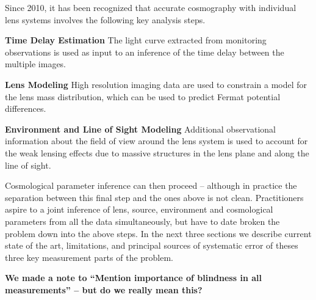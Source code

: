 Since 2010, it has been recognized that accurate cosmography with
individual lens systems involves the following key analysis steps.

\begin{description}
    \item{\bf Time Delay Estimation} The light curve extracted from
    monitoring observations is used as input to an inference of the
    time delay between the multiple images.
    \item{\bf Lens Modeling} High resolution imaging data are used to
    constrain a model for the lens mass distribution, which can be used
    to predict Fermat potential differences.
    \item{\bf Environment and Line of Sight Modeling} Additional observational
    information about the field of view around the lens system is used
    to account for the weak lensing effects due to massive structures in
    the lens plane and along the line of sight.
\end{description}

Cosmological parameter inference can then proceed -- although in
practice the  separation between this final step and the ones above is
not clean. Practitioners aspire to a joint inference of lens, source,
environment and cosmological parameters from all the data
simultaneously, but have to date broken the problem down  into the above
steps. In the next three sections we describe current state of the art,
limitations, and principal sources of systematic error of theses three
key measurement parts of the problem.

{\bf We made a note to ``Mention importance of blindness in all
measurements'' -- but do we really mean this?}
